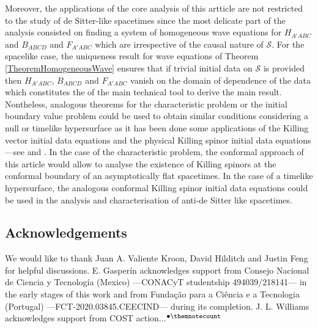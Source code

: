 \documentclass[10pt,a4paper]{article}
\theoremstyle{plain}
\newcounter{mnotecount}%
\newcommand{\mnotex}[1]%
{\protect{\stepcounter{mnotecount}}$^{\mbox{\footnotesize $\bullet$\themnotecount}}$ 
\marginpar{%
\raggedright\tiny\em
$\!\!\!\!\!\!\,\bullet$\themnotecount: #1} }
\begin{document}
\medskip

Moreover, the applications of the core analysis of this artticle
are not restricted to the study of de Sitter-like spacetimes since the most delicate part of the analysis
consisted on finding a system of homogeneous wave equations for
$H_{A'ABC}$ and $B_{ABCD}$ and $F_{A'ABC}$ which are irrespective of
the causal nature of $\mathcal{S}$. For the spacelike case, the
uniqueness result for wave equations of Theorem
\ref{TheoremHomogeneousWave} ensures that if trivial initial data on
$\mathcal{S}$ is provided then $H_{A'ABC}$, $B_{ABCD}$ and $F_{A'ABC}$
vanish on the domain of dependence of the data which constitutes the
of the main technical tool to derive the main result.
Nontheless, analogous theorems for the characteristic problem or
the initial boundary value problem could be used to obtain similar
conditions considering a null or timelike hypersurface as it has been done
some applications of the Killing vector initial data equations and the
physical Killing spinor initial data equations
---see \cite{Pae14a, ColRacVal18} and \cite{CarVal18}.
In the case of the characteristic problem, the conformal approach of
this article would allow to analyse the existence of Killing spinors
at the conformal boundary of an asymptotically flat spacetimes.  In the
case of a timelike hypersurface, the analogous conformal Killing
spinor initial data equations could be used in the analysis and
characterisation of anti-de Sitter like spacetimes.


\subsection*{Acknowledgements}

We would like to thank Juan A. Valiente Kroon, David Hilditch and Justin Feng for helpful discussions.
E. Gasper\'in acknowledges support from Consejo Nacional de
Ciencia y Tecnolog\'ia (Mexico) ---CONACyT studentship
494039/218141--- in the early stages of this work and from Fundaç\~ao
para a Ci\^encia e a Tecnologia (Portugal) ---FCT-2020.03845.CEECIND---
during its completion. J. L. Williams acknowledges support from COST action...\mnotex{Code needed...}
\end{document}
